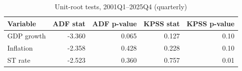 \begin{table}

\caption{\label{tab:tbl-unit-roots-q}Unit-root tests, 2001Q1--2025Q4 (quarterly)}
\centering
\begin{tabular}[t]{lrrrr}
\toprule
Variable & ADF stat & ADF p-value & KPSS stat & KPSS p-value\\
\midrule
GDP growth & -3.360 & 0.065 & 0.127 & 0.10\\
Inflation & -2.358 & 0.428 & 0.228 & 0.10\\
ST rate & -2.523 & 0.360 & 0.757 & 0.01\\
\bottomrule
\end{tabular}
\end{table}
